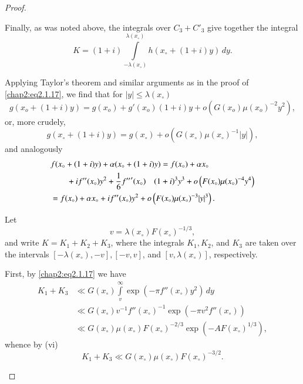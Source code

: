 \begin{proof}
\begin{enumerate}
Finally, as was noted above, the integrals over $C_3+C'_3$ give
together the integral
\begin{equation}\label{chap2:eq2.1.19}
K=(1+i)\int\limits_{-\lambda(x_\circ)}^{\lambda(x_\circ)}h(x_\circ+
(1+i)y)\,dy. 
\end{equation}

Applying Taylor's theorem and similar arguments as in the proof of
\eqref{chap2:eq2.1.17}, we find that for $|y|\leq\lambda(x_\circ)$
\begin{equation}\label{chap2:eq2.1.20}
g(x_o+(1+i)y)=g(x_o)+g'(x_o)(1+i)y+o\left(G(x_o)\mu
(x_o)^{-2}y^2\right),
\end{equation}
or, more crudely,
\begin{equation}\label{chap2:eq2.1.21}
g(x_\circ+(1+i)y)=g(x_\circ)+o\left(G(x_\circ)\mu(x_\circ)^{-1}
|y|\right),
\end{equation}
and analogously 
\begin{align}
& f(x_\circ+(1+i)y)+\alpha(x_\circ+(1+i)y) = f(x_\circ)+\alpha
x_\circ\label{chap2:eq2.1.22}\\
&\qquad +i f''(x_\circ)y^2+\frac{1}{6}{f''}'(x_\circ)\quad(1+i)^3y^3
+o\left(F(x_\circ)\mu(x_\circ)^{-4}y^4\right)\notag\\
&= f(x_\circ)+\alpha x_\circ+i f''(x_\circ)y^2+o\left(F(x_\circ)\mu
(x_\circ)^{-3}|y|^3\right).\label{chap2:eq2.1.23}
\end{align}\pageoriginale

Let
\begin{equation}\label{chap2:eq2.1.24}
v=\lambda(x_\circ)F(x_\circ)^{-1/3},
\end{equation}
and write $K=K_1+K_2+K_3$, where the integrals $K_1,K_2$, and $K_3$
are taken over the intervals $[-\lambda(x_\circ),-v], [-v,v]$, and
$[v,\lambda(x_\circ)]$, respectively.

First, by \eqref{chap2:eq2.1.17} we have 
\begin{align*}
K_1+K_3 & \ll G(x_\circ)\int\limits_v^\infty\exp\left(-\pi
f''(x_\circ) y^2\right)\,dy\\
& \ll G(x_\circ)v^{-1}f''(x_\circ)^{-1}\exp\left(-\pi v^2f''(x_\circ)
\right)\\
& \ll G(x_\circ)\mu(x_\circ)F(x_\circ)^{-2/3}\exp\left(-AF
(x_\circ)^{1/3}\right), 
\end{align*}
whence by (vi)
\begin{equation}\label{chap2:eq2.1.25}
K_1+K_3\ll G(x_\circ)\mu(x_\circ)F(x_\circ)^{-3/2}.
\end{equation}


\end{enumerate}
\end{proof}
